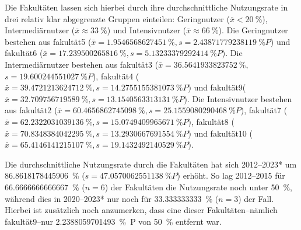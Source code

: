 Die Fakultäten lassen sich hierbei durch ihre durchschnittliche Nutzungsrate in drei relativ klar abgegrenzte Gruppen einteilen: Geringnutzer ($\bar{x}<\SI[round-mode=places,round-precision=2]{20}{\percent}$), Intermediärnutzer ($\bar{x}\approx\SI[round-mode=places,round-precision=2]{33}{\percent}$) und Intensivnutzer ($\bar{x}\approx\SI[round-mode=places,round-precision=2]{66}{\percent}$).
Die Geringnutzer bestehen aus \gls{fakultät5} ($\bar{x}=\SI[round-mode=places,round-precision=2]{1.9546568627451}{\percent},s=\SI[round-mode=places,round-precision=2]{2.43871779238119}{\percent P}$) und \gls{fakultät6} ($\bar{x}=\SI[round-mode=places,round-precision=2]{17.239500265816}{\percent},$\linebreak$s=\SI[round-mode=places,round-precision=2]{5.13233379292414}{\percent P}$).
Die Intermediärnutzer bestehen aus \gls{fakultät3} ($\bar{x}=\SI[round-mode=places,round-precision=2]{36.5641933823752}{\percent},$\linebreak$s=\SI[round-mode=places,round-precision=2]{19.600244551027}{\percent P}$), \gls{fakultät4} ($\bar{x}=\SI[round-mode=places,round-precision=2]{39.4721213624712}{\percent},s=\SI[round-mode=places,round-precision=2]{14.2755155381073}{\percent P}$) und \gls{fakultät9}\linebreak ($\bar{x}=\SI[round-mode=places,round-precision=2]{32.709756719589}{\percent}, s=\SI[round-mode=places,round-precision=2]{13.1540563313131}{\percent P}$).
Die Intensivnutzer bestehen aus \gls{fakultät2} ($\bar{x}=\SI[round-mode=places,round-precision=2]{60.4656862745098}{\percent}, s=\SI[round-mode=places,round-precision=2]{25.1559080290468}{\percent P}$), \gls{fakultät7} ($\bar{x}=\SI[round-mode=places,round-precision=2]{62.2322031039136}{\percent},s=\SI[round-mode=places,round-precision=2]{15.0749409965671}{\percent P}$), \gls{fakultät8} ($\bar{x}=\SI[round-mode=places,round-precision=2]{70.8348384042295}{\percent},s=\SI[round-mode=places,round-precision=2]{13.2930667691554}{\percent P}$) und \gls{fakultät10} ($\bar{x}=\SI[round-mode=places,round-precision=2]{65.4146141215107}{\percent},s=\SI[round-mode=places,round-precision=2]{19.1432492140529}{\percent P}$).

Die durchschnittliche Nutzungsrate durch die Fakultäten hat sich 2012--2023* um \SI[round-mode=places,round-precision=2]{86.8618178445906}{\percent} ($s=\SI[round-mode=places,round-precision=2]{47.0570062551138}{\percent P}$) erhöht.
So lag 2012--2015 für \SI[round-mode=places,round-precision=2]{66,6666666666667}{\percent} ($n=\num{6}$) der Fakultäten die Nutzungsrate noch unter \SI[round-mode=places,round-precision=2]{50}{\percent}, während dies in 2020--2023* nur noch für \SI[round-mode=places,round-precision=2]{33,333333333}{\percent} ($n=\num{3}$) der Fall.
Hierbei ist zusätzlich noch anzumerken, dass eine dieser Fakultäten--nämlich \gls{fakultät9}--nur \SI[round-mode=places,round-precision=2]{2.2388059701493}{\percent P} von \SI[round-mode=places,round-precision=2]{50}{\percent} entfernt war.
\pagebreak

